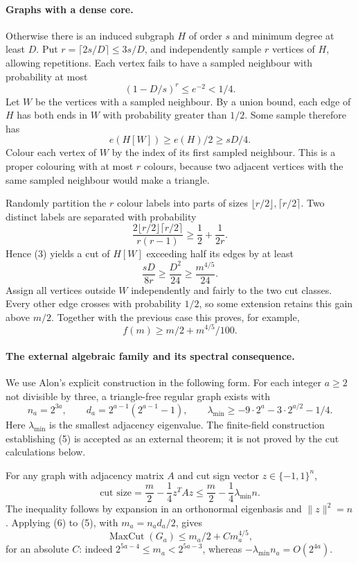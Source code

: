 \paragraph{Graphs with a dense core.}
Otherwise there is an induced subgraph \(H\) of order \(s\) and minimum degree at least \(D\). Put \(r=\lceil2s/D\rceil\leq3s/D\), and independently sample \(r\) vertices of \(H\), allowing repetitions. Each vertex fails to have a sampled neighbour with probability at most
\[
 (1-D/s)^r\leq e^{-2}<1/4.
\]
Let \(W\) be the vertices with a sampled neighbour. By a union bound, each edge of \(H\) has both ends in \(W\) with probability greater than \(1/2\). Some sample therefore has
\[
 e(H[W])\geq e(H)/2\geq sD/4. \tag{3}
\]
Colour each vertex of \(W\) by the index of its first sampled neighbour. This is a proper colouring with at most \(r\) colours, because two adjacent vertices with the same sampled neighbour would make a triangle.

Randomly partition the \(r\) colour labels into parts of sizes \(\lfloor r/2\rfloor,\lceil r/2\rceil\). Two distinct labels are separated with probability
\[
 \frac{2\lfloor r/2\rfloor\lceil r/2\rceil}{r(r-1)}
 \geq\frac12+\frac1{2r}.
\]
Hence (3) yields a cut of \(H[W]\) exceeding half its edges by at least
\[
 \frac{sD}{8r}\geq\frac{D^2}{24}\geq\frac{m^{4/5}}{24}.
\]
Assign all vertices outside \(W\) independently and fairly to the two cut classes. Every other edge crosses with probability \(1/2\), so some extension retains this gain above \(m/2\). Together with the previous case this proves, for example,
\[
 f(m)\geq m/2+m^{4/5}/100. \tag{4}
\]

\paragraph{The external algebraic family and its spectral consequence.}
We use Alon's explicit construction in the following form. For each integer \(a\geq2\) not divisible by three, a triangle-free regular graph exists with
\[
 n_a=2^{3a},\qquad d_a=2^{a-1}(2^{a-1}-1),\qquad
 \lambda_{\min}\geq-9\cdot2^a-3\cdot2^{a/2}-1/4. \tag{5}
\]
Here \(\lambda_{\min}\) is the smallest adjacency eigenvalue. The finite-field construction establishing (5) is accepted as an external theorem; it is not proved by the cut calculations below.

For any graph with adjacency matrix \(A\) and cut sign vector \(z\in\{-1,1\}^n\),
\[
 \text{cut size}=\frac m2-\frac14 z^TAz
 \leq\frac m2-\frac14\lambda_{\min}n. \tag{6}
\]
The inequality follows by expansion in an orthonormal eigenbasis and \(\|z\|^2=n\). Applying (6) to (5), with \(m_a=n_ad_a/2\), gives
\[
 \operatorname{MaxCut}(G_a)\leq m_a/2+C m_a^{4/5}, \tag{7}
\]
for an absolute \(C\): indeed \(2^{5a-4}\leq m_a<2^{5a-3}\), whereas \(-\lambda_{\min}n_a=O(2^{4a})\).

